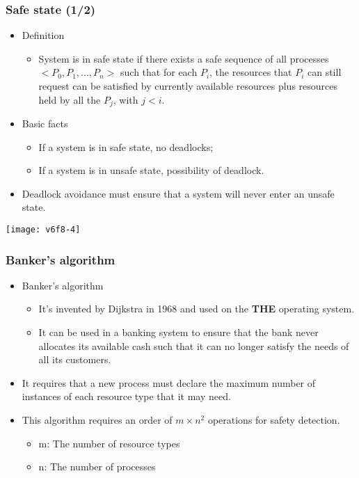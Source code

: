 \documentclass[CJKutf8,dvipsnames,table]{beamer}
\begin{document}
\begin{CJK*}{UTF8}{song}
  \begin{frame}
  \frametitle{Safe state (1/2)} \pause
  \begin{itemize}
  \item{Definition} \pause
    \begin{itemize}
    \item{System is in safe state if there exists a safe sequence of all processes $<P_0, P_1, ..., P_n>$ such that for each $P_i$, the resources that $P_i$ can still request can be satisfied by currently available resources plus resources held by all the $P_j$, with $j<i$.} \pause
    \end{itemize}
  \item{Basic facts} \pause
    \begin{itemize}
    \item{If a system is in safe state, no deadlocks;} \pause
    \item{If a system is in unsafe state,  possibility of deadlock.} \pause
    \end{itemize}
  \item{Deadlock avoidance must ensure that a system will never enter an unsafe state.} \pause
  \end{itemize}
  \begin{center}
	\texttt{[image: v6f8-4]}
  \end{center}
  \end{frame}


  \begin{frame}
  \frametitle{Banker's algorithm} \pause
  \begin{itemize}
  \item{Banker's algorithm} \pause
    \begin{itemize}
    \item{It's invented by Dijkstra in 1968 and used on the \textbf{THE} operating system.} \pause
    \item{It can be used in a banking system to ensure that the bank never allocates its available cash such that it can no longer satisfy the needs of all its customers.} \pause
    \end{itemize}
  \item{It requires that a new process must declare the maximum number of instances of each resource type that it may need.} \pause
  \item{This algorithm requires an order of $m \times n^2$ operations for safety detection.} \pause
  \begin{itemize}
	\item{m: The number of resource types} \pause
	\item{n: The number of processes}
  \end{itemize}


\end{itemize}
\end{frame}
\end{CJK*}
\end{document}
